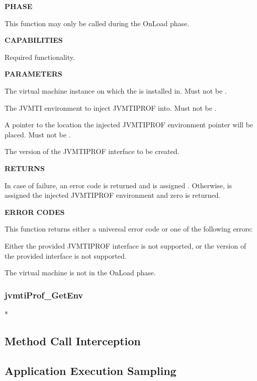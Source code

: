 \bigskip
\noindent \textbf{PHASE}

This function may only be called during the OnLoad phase.

\bigskip
\noindent \textbf{CAPABILITIES}

Required functionality.

\bigskip
\noindent \textbf{PARAMETERS}

 The virtual machine instance on which the  is installed in. Must not be .

 The JVMTI environment to inject JVMTIPROF into. Must not be .

 A pointer to the location the injected JVMTIPROF environment pointer will be placed. Must not be .

 The version of the JVMTIPROF interface to be created.

\bigskip
\noindent \textbf{RETURNS} 

In case of failure, an error code is returned and  is assigned . Otherwise,  is assigned the injected JVMTIPROF environment and zero is returned.

\bigskip
\noindent \textbf{ERROR CODES} 

This function returns either a universal error code or one of the following errors:
\smallskip

\hspace{\parindent}  Either the provided JVMTIPROF interface  is not supported, or the version of the provided  interface is not supported.

\hspace{\parindent}  The virtual machine is not in the OnLoad phase.

\subsubsection*{jvmtiProf\_GetEnv} *


\subsection{Method Call Interception}

\subsection{Application Execution Sampling}

